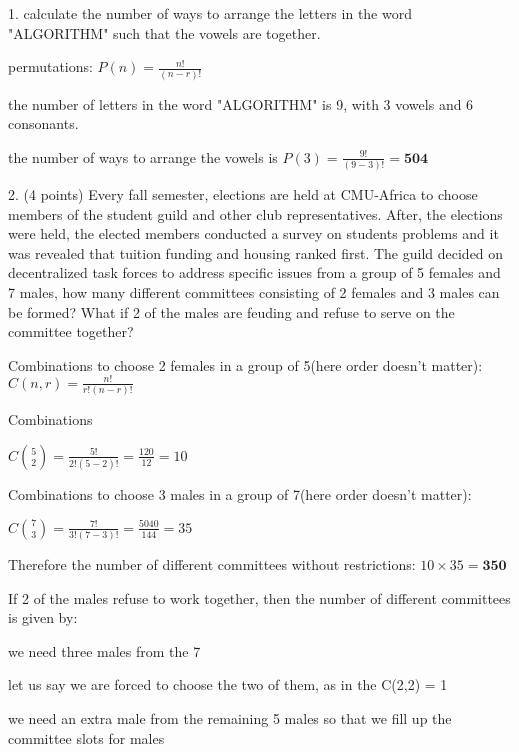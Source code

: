 \documentclass{article}
\begin{document}
1. calculate the number of ways to arrange the letters in the word "ALGORITHM" such that the vowels are together.

permutations: \(P(n) = \frac{n!}{(n-r)!}\)

the number of letters in the word "ALGORITHM" is 9, with 3 vowels and 6 consonants.

the number of ways to arrange the vowels is \(P(3) = \frac{9!}{(9-3)!} = \textbf{504}\) \newline

2. (4 points) Every fall semester, elections are held at CMU-Africa to choose members of the student
guild and other club representatives. After, the elections were held, the elected members conducted
a survey on students problems and it was revealed that tuition funding and housing ranked first.
The guild decided on decentralized task forces to address specific issues from a group of 5 females
and 7 males, how many different committees consisting of 2 females and 3 males can be formed?
What if 2 of the males are feuding and refuse to serve on the committee together?\newline

Combinations to choose 2 females in a group of 5(here order doesn't matter): \(C(n,r) = \frac{n!}{r!(n-r)!}\)\newline

Combinations\newline

\(C\binom{5}{2} = \frac{5!}{2!(5-2)!} = \frac{120}{12} = 10\)\newline

Combinations to choose 3 males in a group of 7(here order doesn't matter):\newline

\(C\binom{7}{3} = \frac{7!}{3!(7-3)!} = \frac{5040}{144} = 35\)\newline

Therefore the number of different committees without restrictions: \(10 \times 35 = \textbf{350}\)\newline

If 2 of the males refuse to work together, then the number of different committees is given by:

we need three males from the 7\newline

let us say we are forced to choose the two of them, as in the C(2,2) = 1\newline

we need an extra male from the remaining 5 males so that we fill up the committee slots for males\newline
\end{document}
